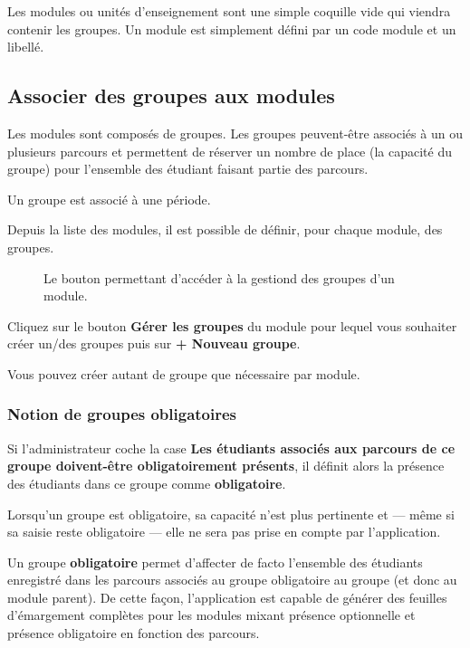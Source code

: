 \documentclass[letterpaper,10pt,french]{sphinxmanual}
\begin{document}
Les modules ou unités d'enseignement sont une simple coquille vide qui viendra contenir les groupes. Un module est simplement défini par un code module et un libellé.


\subsection{Associer des groupes aux modules}
\label{admin:associer-des-groupes-aux-modules}
Les modules sont composés de groupes. Les groupes peuvent-être associés à un ou plusieurs parcours et permettent de réserver un nombre de place (la capacité du groupe) pour l'ensemble des étudiant faisant partie des parcours.

Un groupe est associé à une période.

Depuis la liste des modules, il est possible de définir, pour chaque module, des groupes.
\begin{figure}[htbp]
\centering
\capstart

\caption{Le bouton permettant d'accéder à la gestiond des groupes d'un module.}\end{figure}

Cliquez sur le bouton \textbf{Gérer les groupes} du module pour lequel vous souhaiter créer un/des groupes puis sur \textbf{+ Nouveau groupe}.

Vous pouvez créer autant de groupe que nécessaire par module.


\subsubsection{Notion de groupes obligatoires}
\label{admin:notion-de-groupes-obligatoires}
Si l'administrateur coche la case \textbf{Les étudiants associés aux parcours de ce groupe doivent-être obligatoirement présents}, il définit alors la présence des étudiants dans ce groupe comme \textbf{obligatoire}.

Lorsqu'un groupe est obligatoire, sa capacité n'est plus pertinente et — même si sa saisie reste obligatoire — elle ne sera pas prise en compte par l'application.

Un groupe \textbf{obligatoire} permet d'affecter de facto l'ensemble des étudiants enregistré dans les parcours associés au groupe obligatoire au groupe (et donc au module parent). De cette façon, l'application est capable de générer des feuilles d'émargement complètes pour les modules mixant présence optionnelle et présence obligatoire en fonction des parcours.
\end{document}
